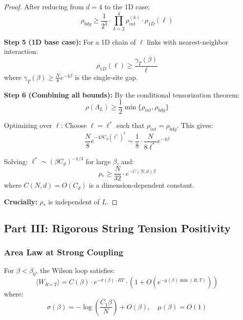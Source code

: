 \begin{proof}
After reducing from $d=4$ to the 1D case:
\begin{equation}
\rho_{bdy} \geq \frac{1}{2^3} \cdot \prod_{k=2}^{4} \rho_{int}^{(k)} \cdot \rho_{1D}(\ell)
\end{equation}

\textbf{Step 5 (1D base case):}
For a 1D chain of $\ell$ links with nearest-neighbor interaction:
\begin{equation}
\rho_{1D}(\ell) \geq \frac{\gamma_T(\beta)}{\ell}
\end{equation}
where $\gamma_T(\beta) \geq \frac{N}{8} e^{-4\beta}$ is the single-site gap.

\textbf{Step 6 (Combining all bounds):}
By the conditional tensorization theorem:
\begin{equation}
\rho(\Lambda_L) \geq \frac{1}{2} \min\{\rho_{int}, \rho_{bdy}\}
\end{equation}

Optimizing over $\ell$: Choose $\ell = \ell^*$ such that $\rho_{int} = \rho_{bdy}$. This gives:
\begin{equation}
\frac{N}{8} e^{-4\beta C_d (\ell^*)^3} \sim \frac{1}{8} \cdot \frac{N}{8\ell^*} e^{-4\beta}
\end{equation}

Solving: $\ell^* \sim (\beta C_d)^{-1/3}$ for large $\beta$, and:
\begin{equation}
\rho_* \geq \frac{N}{32} \cdot e^{-C(N,d) \beta}
\end{equation}
where $C(N,d) = O(C_d)$ is a dimension-dependent constant.

\textbf{Crucially:} $\rho_*$ is independent of $L$.
\end{proof}


\subsection{Part III: Rigorous String Tension Positivity}
\label{subsec:string_tension_rigorous}

\subsubsection{Area Law at Strong Coupling}

\begin{theorem}
\label{thm:area_law_rigorous}
For $\beta < \beta_0$, the Wilson loop satisfies:
\begin{equation}
\langle W_{R \times T} \rangle = C(\beta) \cdot e^{-\sigma(\beta) \cdot RT} \cdot (1 + O(e^{-\mu(\beta)\min(R,T)}))
\end{equation}
where:
\begin{equation}
\sigma(\beta) = -\log\left(\frac{C_1 \beta}{N}\right) + O(\beta), \quad \mu(\beta) = O(1)
\end{equation}
\end{theorem}

